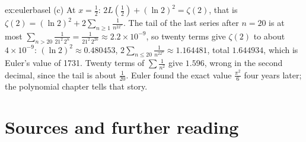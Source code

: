 \begin{solution}{ex:eulerbasel}
(c) At $x=\frac12$: $2L\left(\frac12\right)+(\ln2)^2=\zeta(2)$, that is $\zeta(2)=(\ln2)^2+2\sum_{n\ge1}\frac1{n^22^n}$. The tail of the last series after $n=20$ is at most $\sum_{n>20}\frac1{21^2\,2^n}=\frac1{21^2\,2^{20}}\approx2.2\times10^{-9}$, so twenty terms give $\zeta(2)$ to about $4\times10^{-9}$: $(\ln2)^2\approx0.480453$, $2\sum_{n\le20}\frac1{n^22^n}\approx1.164481$, total $1.644934$, which is Euler's value of 1731. Twenty terms of $\sum\frac1{n^2}$ give $1.596$, wrong in the second decimal, since the tail is about $\frac1{20}$. Euler found the exact value $\frac{\pi^2}6$ four years later; the polynomial chapter tells that story.
\end{solution}

\section*{Sources and further reading}

